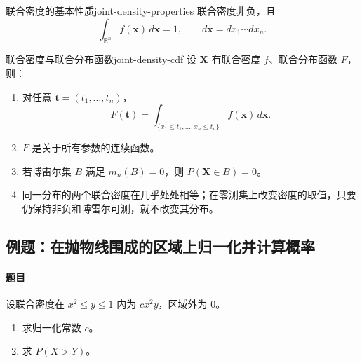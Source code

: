 \begin{proposition}{联合密度的基本性质}{joint-density-properties}
联合密度非负，且
\[
\int_{\mathbb R^n}f(\boldsymbol x)\,d\boldsymbol x=1,
\qquad d\boldsymbol x=dx_1\cdots dx_n.
\]
\end{proposition}

\begin{proposition}{联合密度与联合分布函数}{joint-density-cdf}
设 $\boldsymbol X$ 有联合密度 $f$、联合分布函数 $F$，则：
\begin{enumerate}
\item 对任意 $\boldsymbol t=(t_1,\ldots,t_n)$，
\[
F(\boldsymbol t)=\int_{\{x_1\leq t_1,\ldots,x_n\leq t_n\}}
 f(\boldsymbol x)\,d\boldsymbol x.
\]
\item $F$ 是关于所有参数的连续函数。
\item 若博雷尔集 $B$ 满足 $m_n(B)=0$，则 $P(\boldsymbol X\in B)=0$。
\item 同一分布的两个联合密度在几乎处处相等；在零测集上改变密度的取值，只要仍保持非负和博雷尔可测，就不改变其分布。
\end{enumerate}
\end{proposition}

\subsection{例题：在抛物线围成的区域上归一化并计算概率}\label{note:c3:e3}
\paragraph{题目}
设联合密度在 $x^2\leq y\leq1$ 内为 $cx^2y$，区域外为 $0$。
\begin{enumerate}
\item 求归一化常数 $c$。

\item 求 $P(X>Y)$。
\end{enumerate}

